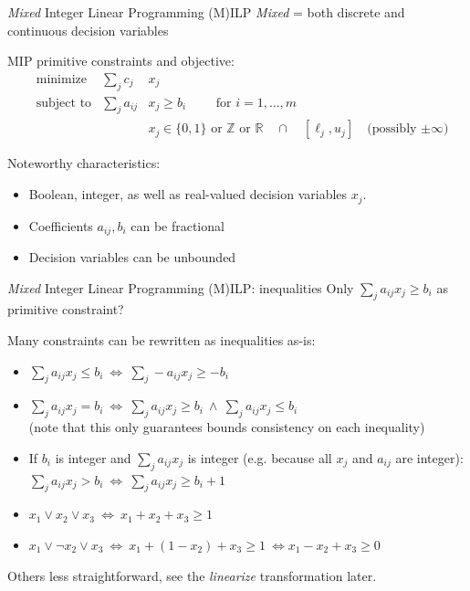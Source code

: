 \documentclass{cons-beamer}
\begin{document}
\begin{frame}{\textit{Mixed} Integer Linear Programming (M)ILP}
	\textit{Mixed} = both discrete and continuous decision variables
	\vfill
	
	MIP primitive constraints and objective:
	\begin{align*}
		& \text{minimize}
			& \sum_j c_j & x_j \\
		& \text{subject to}
			& \sum_{j} a_{ij} & x_j \geq b_i \qquad \text{ for } i=1,\ldots,m \\
		&        
		    && x_j \in \{0,1\} \text{ or } \mathbb{Z} \text{ or } \mathbb{R} \quad\cap\quad [\ell_j,u_j] \quad\text{(possibly $\pm\infty$)}
	\end{align*}
	\vfill
	
	Noteworthy characteristics:
	\begin{itemize}
		\item Boolean, integer, as well as real-valued decision variables $x_j$.
		\item Coefficients $a_{ij},b_i$ can be fractional
		\item Decision variables can be unbounded
	\end{itemize}
\end{frame}

\begin{frame}{\textit{Mixed} Integer Linear Programming (M)ILP: inequalities}
	Only $\sum_{j} a_{ij} x_j \geq b_i$ as primitive constraint?
	\vfill
	
	Many constraints can be rewritten as inequalities as-is:
	\begin{itemize}
		\item $\sum_{j} a_{ij} x_j \leq b_i ~\Leftrightarrow~ \sum_{j} -a_{ij} x_j \geq -b_i$
		
		\item $\sum_{j} a_{ij} x_j = b_i ~\Leftrightarrow~ \sum_{j} a_{ij} x_j \geq b_i ~\land~ \sum_{j} a_{ij} x_j \leq b_i$ \\
		(note that this only guarantees bounds consistency on each inequality)
		
		\item If $b_i$ is integer and $\sum_j a_{ij} x_j$ is integer (e.g. because all $x_j$ and $a_{ij}$ are integer): $\sum_{j} a_{ij} x_j > b_i ~\Leftrightarrow~ \sum_{j} a_{ij} x_j \geq b_i+1$
		\vfill
		\pause
		
		\item $x_1 \vee x_2 \vee x_3 ~\Leftrightarrow~ x_1 + x_2 + x_3 \geq 1$
		
		\item $x_1 \vee \neg x_2 \vee x_3 ~\Leftrightarrow~ x_1 + (1 - x_2) + x_3 \geq 1 ~\Leftrightarrow x_1 - x_2 + x_3 \geq 0$
	\end{itemize}
	\vfill
	
	Others less straightforward, see the \textit{linearize} transformation later.
\end{frame}
\end{document}
